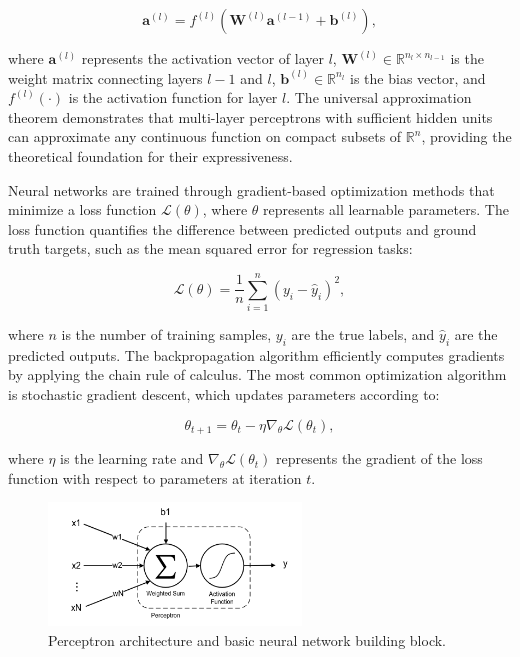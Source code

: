 \begin{equation}
\mathbf{a}^{(l)} = f^{(l)}\left(\mathbf{W}^{(l)}\mathbf{a}^{(l-1)} + \mathbf{b}^{(l)}\right),
\end{equation}

where $\mathbf{a}^{(l)}$ represents the activation vector of layer $l$, $\mathbf{W}^{(l)} \in \mathbb{R}^{n_l \times n_{l-1}}$ is the weight matrix connecting layers $l-1$ and $l$, $\mathbf{b}^{(l)} \in \mathbb{R}^{n_l}$ is the bias vector, and $f^{(l)}(\cdot)$ is the activation function for layer $l$. The universal approximation theorem demonstrates that multi-layer perceptrons with sufficient hidden units can approximate any continuous function on compact subsets of $\mathbb{R}^n$, providing the theoretical foundation for their expressiveness.

Neural networks are trained through gradient-based optimization methods that minimize a loss function $\mathcal{L}(\theta)$, where $\theta$ represents all learnable parameters. The loss function quantifies the difference between predicted outputs and ground truth targets, such as the mean squared error for regression tasks:

\begin{equation}
\mathcal{L}(\theta) = \frac{1}{n}\sum_{i=1}^{n}(y_i - \hat{y}_i)^2,
\end{equation}

where $n$ is the number of training samples, $y_i$ are the true labels, and $\hat{y}_i$ are the predicted outputs. The backpropagation algorithm efficiently computes gradients by applying the chain rule of calculus. The most common optimization algorithm is stochastic gradient descent, which updates parameters according to:

\begin{equation}
\theta_{t+1} = \theta_t - \eta \nabla_\theta \mathcal{L}(\theta_t),
\end{equation}

where $\eta$ is the learning rate and $\nabla_\theta \mathcal{L}(\theta_t)$ represents the gradient of the loss function with respect to parameters at iteration $t$.

\begin{figure}[t]
\centering
\includegraphics[width=0.6\textwidth]{../Images/perceptron.png}
\caption{Perceptron architecture and basic neural network building block.}
\label{fig:perceptron}
\end{figure}

